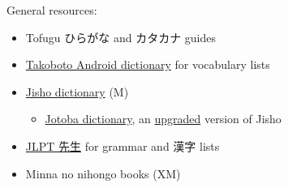 \documentclass{article}
\begin{document}
\tableofcontents
\pagebreak

General resources:
\begin{itemize}
    \item Tofugu ひらがな and カタカナ guides
    \item \href{https://play.google.com/store/apps/details?id=jp.takoboto}{Takoboto Android dictionary} for vocabulary lists
    \item \href{https://jisho.org/}{Jisho dictionary} (M)
    \begin{itemize}
        \item \href{https://jotoba.com/}{Jotoba dictionary}, an \href{https://www.reddit.com/r/LearnJapanese/comments/11mzx4s/comment/jbklflf/}{upgraded} version of Jisho
    \end{itemize}
    \item \href{https://jlptsensei.com/}{JLPT 先生} for grammar and 漢字 lists
    \item Minna no nihongo books (XM)
\end{itemize}



\end{document}
